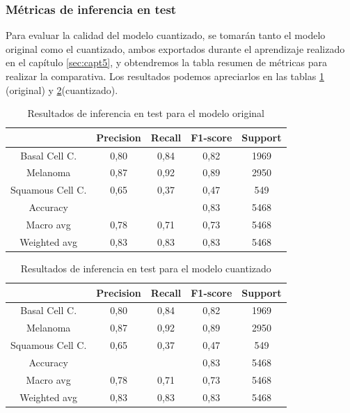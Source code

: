 \subsubsection{Métricas de inferencia en test}
Para evaluar la calidad del modelo cuantizado, se tomarán tanto el modelo original como el cuantizado, ambos exportados durante el aprendizaje realizado en el capítulo \ref{sec:capt5}, y obtendremos la tabla resumen de métricas para realizar la comparativa.
Los resultados  podemos apreciarlos en las tablas \ref{tab:maltestorig} (original) y \ref{tab:maltestquant}(cuantizado).

\begin{table}[!ht]
	\centering
	\begin{tabular}{|c|c|c|c|c|}
		\hline
		~ & Precision & Recall & F1-score & Support \\ \hline
		Basal Cell C. & 0,80 & 0,84 & 0,82 & 1969 \\
		Melanoma & 0,87 & 0,92 & 0,89 & 2950 \\
		Squamous Cell C. & 0,65 & 0,37 & 0,47 & 549 \\ \hline
		Accuracy & ~ & ~ & 0,83 & 5468 \\ \hline
		Macro avg & 0,78 & 0,71 & 0,73 & 5468 \\
		Weighted avg & 0,83 & 0,83 & 0,83 & 5468 \\ \hline
	\end{tabular}
	\caption{Resultados de inferencia en test para el modelo original}
	\label{tab:maltestorig}
\end{table}

\begin{table}[!ht]
	\centering
	\begin{tabular}{|c|c|c|c|c|}
		\hline
		~ & Precision & Recall & F1-score & Support \\ \hline
		Basal Cell C. & 0,80 & 0,84 & 0,82 & 1969 \\
		Melanoma & 0,87 & 0,92 & 0,89 & 2950 \\
		Squamous Cell C. & 0,65 & 0,37 & 0,47 & 549 \\ \hline
		Accuracy & ~ & ~ & 0,83 & 5468 \\ \hline
		Macro avg & 0,78 & 0,71 & 0,73 & 5468 \\
		Weighted avg & 0,83 & 0,83 & 0,83 & 5468 \\ \hline
	\end{tabular}
	\caption{Resultados de inferencia en test para el modelo cuantizado}
	\label{tab:maltestquant}
\end{table}

